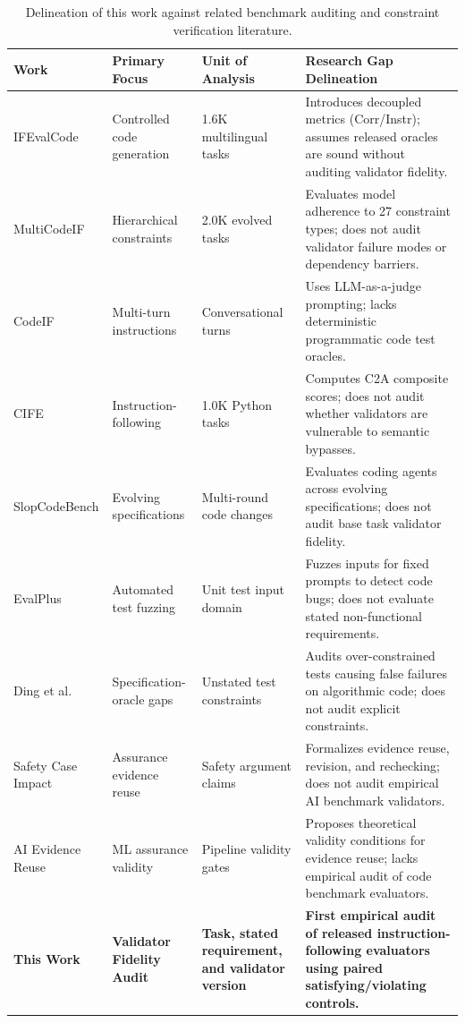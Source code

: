 \documentclass[runningheads]{llncs}
\begin{document}
\begin{table}[t]
\caption{Delineation of this work against related benchmark auditing and constraint verification literature.}
\label{tab:paper2_delineation}
\centering
\scriptsize
\setlength{\tabcolsep}{3pt}
\begin{tabularx}{\textwidth}{@{}l>{\raggedright\arraybackslash}p{2.6cm}>{\raggedright\arraybackslash}p{2.8cm}>{\raggedright\arraybackslash}X@{}}
\toprule
\textbf{Work} & \textbf{Primary Focus} & \textbf{Unit of Analysis} & \textbf{Research Gap Delineation} \\
\midrule
IFEvalCode \cite{yang_ifevalcode_2025} & Controlled code generation & 1.6K multilingual tasks & Introduces decoupled metrics (Corr/Instr); assumes released oracles are sound without auditing validator fidelity. \\
MultiCodeIF \cite{sysusel_multicodeif_2026} & Hierarchical constraints & 2.0K evolved tasks & Evaluates model adherence to 27 constraint types; does not audit validator failure modes or dependency barriers. \\
CodeIF \cite{yan_codeif_2025} & Multi-turn instructions & Conversational turns & Uses LLM-as-a-judge prompting; lacks deterministic programmatic code test oracles. \\
CIFE \cite{cife_benchmark_2025} & Instruction-following & 1.0K Python tasks & Computes C2A composite scores; does not audit whether validators are vulnerable to semantic bypasses. \\
SlopCodeBench \cite{slopcodebench_2026} & Evolving specifications & Multi-round code changes & Evaluates coding agents across evolving specifications; does not audit base task validator fidelity. \\
EvalPlus \cite{liu_evalplus_2023} & Automated test fuzzing & Unit test input domain & Fuzzes inputs for fixed prompts to detect code bugs; does not evaluate stated non-functional requirements. \\
Ding et al. \cite{ding_spec_oracle_gaps_2026} & Specification-oracle gaps & Unstated test constraints & Audits over-constrained tests causing false failures on algorithmic code; does not audit explicit constraints. \\
Safety Case Impact \cite{lawford_safety_case_impact_2017} & Assurance evidence reuse & Safety argument claims & Formalizes evidence reuse, revision, and rechecking; does not audit empirical AI benchmark validators. \\
AI Evidence Reuse \cite{ai_evidence_reuse_2026} & ML assurance validity & Pipeline validity gates & Proposes theoretical validity conditions for evidence reuse; lacks empirical audit of code benchmark evaluators. \\
\midrule
\textbf{This Work} & \textbf{Validator Fidelity Audit} & \textbf{Task, stated requirement, and validator version} & \textbf{First empirical audit of released instruction-following evaluators using paired satisfying/violating controls.} \\
\bottomrule
\end{tabularx}
\end{table}
\end{document}

